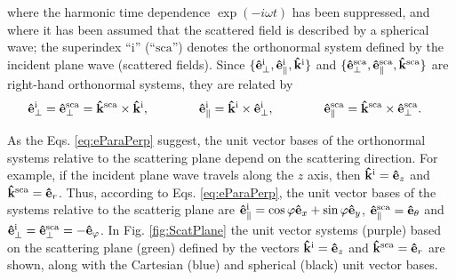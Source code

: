 %
where the harmonic time dependence  $\exp(-i\omega t)$ has been suppressed, and where it has been assumed that the scattered field is described by a spherical wave; the superindex ``$\text{i}$'' (``$\text{sca}$'') denotes the orthonormal system defined by the incident plane wave (scattered fields).  Since $\{\vu{e}_\perp^\text{i}, \vu{e}_\parallel^\text{i},\vu{k}^\text{i} \}$ and $\{\vu{e}_\perp^\text{sca}, \vu{e}_\parallel^\text{sca},\vu{k}^\text{sca} \}$ are right-hand orthonormal systems, they are related by 
%
\begin{align}
	\vu{e}_\perp^\text{i} = \vu{e}_\perp^\text{sca}  & =  \vu{k}^\text{sca} \times \vu{k}^\text{i}, 
	\qquad\qquad
	\vu{e}^\text{i}_\parallel = \vu{k}^\text{i}\times \vu{e}^\text{i}_\perp,
	\qquad\qquad
\vu{e}^\text{sca}_\parallel = \vu{k}^\text{sca} \times \vu{e}_\perp^\text{sca}.
	\label{eq:eParaPerp}
\end{align}
%

As the Eqs. \eqref{eq:eParaPerp} suggest, the unit vector bases of the orthonormal systems relative to the scattering plane depend on the scattering direction. For example, if the incident plane wave travels along the $z$ axis, then $\vu{k}^\text{i} = \vu{e}_z$ and $\vu{k}^\text{sca} = \vu{e}_r$. Thus, according to Eqs. \eqref{eq:eParaPerp}, the unit vector bases of the systems relative to the scatterig plane are   $\vu{e}_\parallel^\text{i} = \cos\varphi \vu{e}_x +\sin\varphi \vu{e}_y$, $\vu{e}_\parallel^\text{sca} = \vu{e}_\theta$ and $\vu{e}_\perp^\text{i} = \vu{e}_\perp^\text{sca}  = - \vu{e}_\varphi$. In Fig. \ref{fig:ScatPlane} the unit vector systems (purple) based on the  scattering plane  (green) defined by the vectors $\vu{k}^\text{i}=\vu{e}_z$ and $\vu{k}^\text{sca} = \vu{e}_r$ are shown, along with the Cartesian (blue) and spherical (black) unit vector bases.
 

